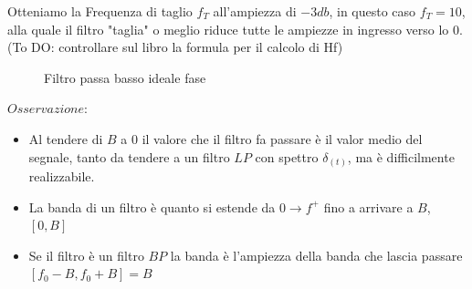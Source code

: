            Otteniamo la Frequenza di taglio $f_T$ all'ampiezza di $-3db$, in questo caso $f_T = 10$, alla quale
            il filtro "taglia" o meglio riduce tutte le ampiezze in ingresso verso lo 0.
            (To DO: controllare sul libro la formula per il calcolo di Hf)
            \begin{figure}[H]
                \centering
                \caption{Filtro passa basso ideale fase}
                \label{fig:LP filter phase}
            \end{figure} 

            $Osservazione$: 
            \begin{itemize}
                \item{
                    Al tendere di $B$ a $0$ il valore che il filtro fa passare è il valor medio del segnale, tanto da tendere
                    a un filtro $LP$ con spettro $\delta_{(t)}$, ma è difficilmente realizzabile.
                }
                \item{
                    La banda di un filtro è quanto si estende da $0 \rightarrow f^+$ fino a arrivare a $B$,$[0,B]$
                }
                \item{
                    Se il filtro è un filtro $BP$ la banda è l'ampiezza della banda che lascia passare $[f_0-B,f_0+B] = B$
                }
            \end{itemize}
